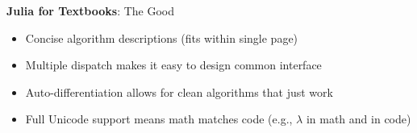 \begin{frame}[fragile]{\textbf{Julia for Textbooks}: \textcolor{paloalto}{The Good}}
    
\pause

\begin{itemize}
  \item \textcolor{paloalto}{Concise} algorithm descriptions (fits within single page) \pause
  \item \textcolor{paloalto}{Multiple dispatch} makes it easy to design common interface \pause
  \item \textcolor{paloalto}{Auto-differentiation} allows for clean algorithms that just work \pause
  \item \textcolor{paloalto}{Full Unicode support} means math matches code (e.g., $\lambda$ in math and  in code)
\end{itemize}

\pause

\phantom{---}

\small
{}

\end{frame}